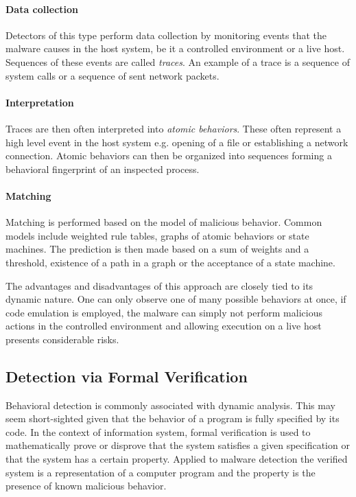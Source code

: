 \paragraph*{Data collection} Detectors of this type perform data collection by monitoring events that the malware causes in the host system, be it a controlled environment or a live host. Sequences of these events are called \emph{traces}. An example of a trace is a sequence of system calls or a sequence of sent network packets.

\paragraph*{Interpretation} Traces are then often interpreted into \emph{atomic behaviors}. These often represent a high level event in the host system e.g. opening of a file or establishing a network connection. Atomic behaviors can then be organized into sequences forming a behavioral fingerprint of an inspected process.

\paragraph*{Matching} Matching is performed based on the model of malicious behavior. Common models include weighted rule tables, graphs of atomic behaviors or state machines. The prediction is then made based on a sum of weights and a threshold, existence of a path in a graph or the acceptance of a state machine.

The advantages and disadvantages of this approach are closely tied to its dynamic nature. One can only observe one of many possible behaviors at once, if code emulation is employed, the malware can simply not perform malicious actions in the controlled environment and allowing execution on a live host presents considerable risks.

\subsection{Detection via Formal Verification}
Behavioral detection is commonly associated with dynamic analysis. This may seem short-sighted given that the behavior of a program is fully specified by its code. In the context of information system, formal verification is used to mathematically prove or disprove that the system satisfies a given specification or that the system has a certain property. Applied to malware detection the verified system is a representation of a computer program and the property is the presence of known malicious behavior.

